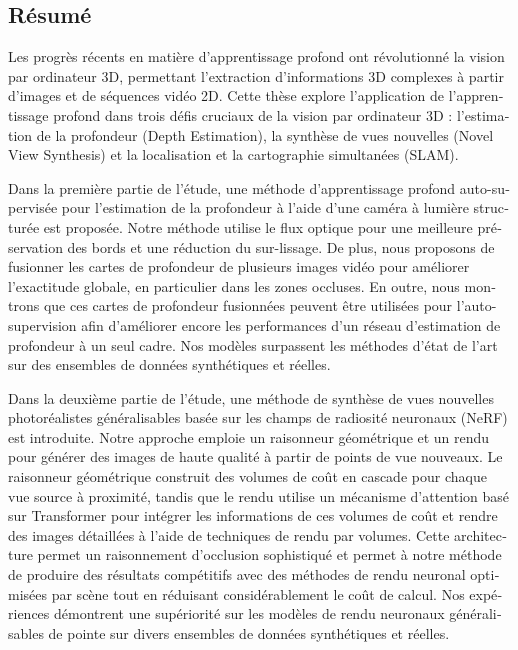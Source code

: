 \begin{otherlanguage}{french}
\cleardoublepage
\chapter*{Résumé}
Les progrès récents en matière d'apprentissage profond ont révolutionné la vision par ordinateur 3D, permettant l'extraction d'informations 3D complexes à partir d'images et de séquences vidéo 2D. Cette thèse explore l'application de l'apprentissage profond dans trois défis cruciaux de la vision par ordinateur 3D : l'estimation de la profondeur (Depth Estimation), la synthèse de vues nouvelles (Novel View Synthesis) et la localisation et la cartographie simultanées (SLAM).

\vspace{2ex}
Dans la première partie de l'étude, une méthode d'apprentissage profond auto-supervisée pour l'estimation de la profondeur à l'aide d'une caméra à lumière structurée est proposée. Notre méthode utilise le flux optique pour une meilleure préservation des bords et une réduction du sur-lissage. De plus, nous proposons de fusionner les cartes de profondeur de plusieurs images vidéo pour améliorer l'exactitude globale, en particulier dans les zones occluses. En outre, nous montrons que ces cartes de profondeur fusionnées peuvent être utilisées pour l'auto-supervision afin d'améliorer encore les performances d'un réseau d'estimation de profondeur à un seul cadre. Nos modèles surpassent les méthodes d'état de l'art sur des ensembles de données synthétiques et réelles.

\vspace{2ex}
Dans la deuxième partie de l'étude, une méthode de synthèse de vues nouvelles photoréalistes généralisables basée sur les champs de radiosité neuronaux (NeRF) est introduite. Notre approche emploie un raisonneur géométrique et un rendu pour générer des images de haute qualité à partir de points de vue nouveaux. Le raisonneur géométrique construit des volumes de coût en cascade pour chaque vue source à proximité, tandis que le rendu utilise un mécanisme d'attention basé sur Transformer pour intégrer les informations de ces volumes de coût et rendre des images détaillées à l'aide de techniques de rendu par volumes. Cette architecture permet un raisonnement d'occlusion sophistiqué et permet à notre méthode de produire des résultats compétitifs avec des méthodes de rendu neuronal optimisées par scène tout en réduisant considérablement le coût de calcul. Nos expériences démontrent une supériorité sur les modèles de rendu neuronaux généralisables de pointe sur divers ensembles de données synthétiques et réelles.


\end{otherlanguage}
